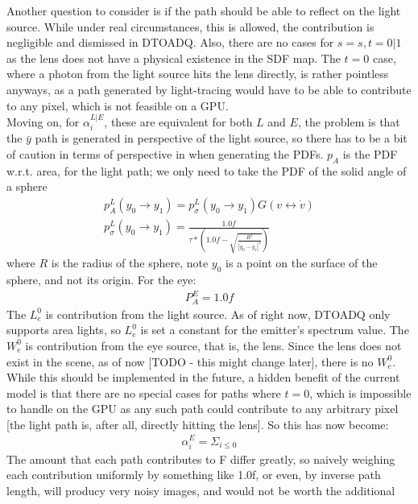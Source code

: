 \message{ !name(test.tex)}\documentclass{article}
\begin{document}
    Another question to consider is if the path should be able to reflect on the
light source. While under real circumstances, this is allowed, the contribution
is negligible and dismissed in DTOADQ. Also, there are no cases for $s = s, t =
0|1$ as the lens does not have a physical existence in the SDF map. The $t = 0$
case, where a photon from the light source hits the lens directly, is rather
pointless anyways, as a path generated by light-tracing would have to be able to
contribute to any pixel, which is not feasible on a GPU.
\\
    Moving on, for $\alpha^{L|E}_i$, these are equivalent for both $L$ and $E$,
the problem is that the $\bar{y}$ path is generated in perspective of the light
source, so there has to be a bit of caution in terms of perspective in when
generating the PDFs. $p_A$ is the PDF w.r.t. area, for the light path; we only
need to take the PDF of the solid angle of a sphere
  \begin{align}
    p_A^L(y_0 \rightarrow y_1) = p_{\sigma}^L(y_0 \rightarrow y_1) G(v
    \leftrightarrow \dot{v})\\
    p_{\sigma}^L(y_0 \rightarrow y_1) = \frac{1.0f}{\tau * (1.0f -
    \sqrt{\frac{R^2}{|y_0 - y_1|^2}})}
  \end{align}
    where $R$ is the radius of the sphere, note $y_0$ is a point on the surface
    of the sphere, and not its origin. For the eye:
  \begin{align}
    P_A^E = 1.0f
  \end{align}
    The $L^0_e$ is contribution from the light source. As of right now, DTOADQ
only supports area lights, so $L^0_e$ is set a constant for the emitter's
spectrum value. The $W_e^0$ is contribution from the eye source, that is, the
lens. Since the lens does not exist in the scene, as of now [TODO - this might
change later], there is no $W_e^0$. While this should be implemented in the
future, a hidden benefit of the current model is that there are no special cases
for paths where $t = 0$, which is impossible to handle on the GPU as any such
path could contribute to any arbitrary pixel [the light path is, after all,
directly hitting the lens]. So this has now become:
  \begin{align}
    \alpha_i^E = \Sigma_{i\leq 0} 
  \end{align}
  The amount that each path contributes to F differ greatly, so naively weighing
each contribution uniformly by something like 1.0f, or even, by inverse path
length, will producy very noisy images, and would not be worth the additional
\end{document}
